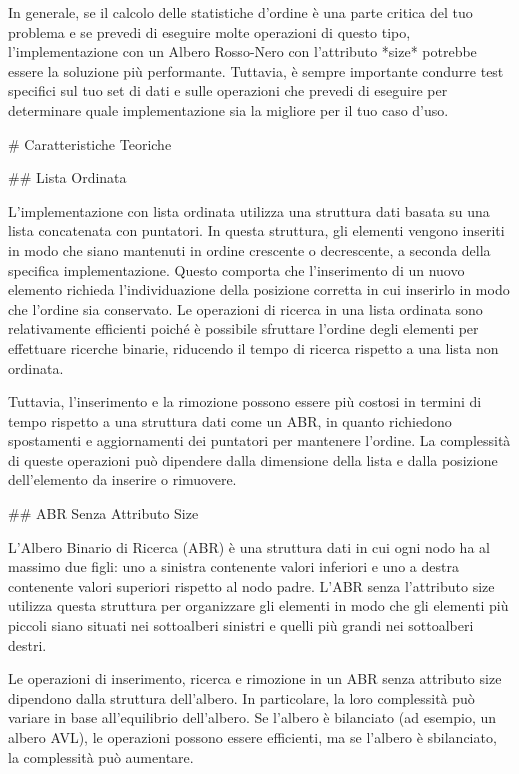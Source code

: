\documentclass[twocolumn]{article}
\begin{document}
\begin{markdown}
In generale, se il calcolo delle statistiche d'ordine è una parte critica del tuo problema e se prevedi di eseguire molte operazioni di questo tipo, l'implementazione con un Albero Rosso-Nero con l'attributo *size* potrebbe essere la soluzione più performante. Tuttavia, è sempre importante condurre test specifici sul tuo set di dati e sulle operazioni che prevedi di eseguire per determinare quale implementazione sia la migliore per il tuo caso d'uso.

# Caratteristiche Teoriche

## Lista Ordinata

L'implementazione con lista ordinata utilizza una struttura dati basata su una lista concatenata con puntatori. In questa struttura, gli elementi vengono inseriti in modo che siano mantenuti in ordine crescente o decrescente, a seconda della specifica implementazione. Questo comporta che l'inserimento di un nuovo elemento richieda l'individuazione della posizione corretta in cui inserirlo in modo che l'ordine sia conservato. Le operazioni di ricerca in una lista ordinata sono relativamente efficienti poiché è possibile sfruttare l'ordine degli elementi per effettuare ricerche binarie, riducendo il tempo di ricerca rispetto a una lista non ordinata.

Tuttavia, l'inserimento e la rimozione possono essere più costosi in termini di tempo rispetto a una struttura dati come un ABR, in quanto richiedono spostamenti e aggiornamenti dei puntatori per mantenere l'ordine. La complessità di queste operazioni può dipendere dalla dimensione della lista e dalla posizione dell'elemento da inserire o rimuovere.

## ABR Senza Attributo Size

L'Albero Binario di Ricerca (ABR) è una struttura dati in cui ogni nodo ha al massimo due figli: uno a sinistra contenente valori inferiori e uno a destra contenente valori superiori rispetto al nodo padre. L'ABR senza l'attributo size utilizza questa struttura per organizzare gli elementi in modo che gli elementi più piccoli siano situati nei sottoalberi sinistri e quelli più grandi nei sottoalberi destri.

Le operazioni di inserimento, ricerca e rimozione in un ABR senza attributo size dipendono dalla struttura dell'albero. In particolare, la loro complessità può variare in base all'equilibrio dell'albero. Se l'albero è bilanciato (ad esempio, un albero AVL), le operazioni possono essere efficienti, ma se l'albero è sbilanciato, la complessità può aumentare.


\end{markdown}
\end{document}
